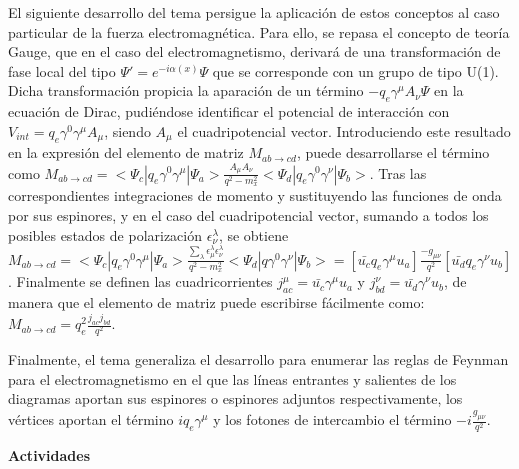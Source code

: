 El siguiente desarrollo del tema persigue la aplicación de estos conceptos al caso particular de la fuerza electromagnética. Para ello, se repasa el concepto de teoría Gauge, que en el caso del electromagnetismo, derivará de una transformación de fase local del tipo $\Psi' = e^{-i\alpha(x)}\Psi$ que se corresponde con un grupo de tipo U(1). Dicha transformación propicia la aparación de un término $-q_e\gamma^\mu A_{\nu}\Psi$ en la ecuación de Dirac, pudiéndose identificar el potencial de interacción con $V_{int}=q_e\gamma^0\gamma^\mu A_\mu$, siendo $A_\mu$ el cuadripotencial vector. Introduciendo este resultado en la expresión del elemento de matriz $M_{ab\rightarrow cd}$, puede desarrollarse el término como  $M_{ab\rightarrow cd}=<\Psi_c|q_e\gamma^0\gamma^\mu|\Psi_a>\frac{A_\mu A_\nu}{q^2-m_{x}^2}<\Psi_d|q_e\gamma^0\gamma^\nu|\Psi_b>$. Tras las correspondientes integraciones de momento y sustituyendo las funciones de onda por sus espinores, y en el caso del cuadripotencial vector, sumando a todos los posibles estados de polarización $\epsilon_\nu^\lambda$, se obtiene $M_{ab\rightarrow cd}=<\Psi_c|q_e\gamma^0\gamma^\mu|\Psi_a>\frac{\sum_{\lambda}\epsilon_\mu^\lambda\epsilon_\nu^\lambda}{q^2-m_{x}^2}<\Psi_d|q\gamma^0\gamma^\nu|\Psi_b>=[\bar{u_c}q_e\gamma^\mu u_a]\frac{-g_{\mu\nu}}{q^2}[\bar{u_d}q_e\gamma^\nu u_b]$. Finalmente se definen las cuadricorrientes $j_{ac}^\mu=\bar{u_c}\gamma^\mu u_a$ y $j_{bd}^\nu=\bar{u_d}\gamma^\nu u_b$, de manera que el elemento de matriz puede escribirse fácilmente como: $M_{ab\rightarrow cd}=q_e^2\frac{j_{ac}j_{bd}}{q^2}$. 

Finalmente, el tema generaliza el desarrollo para enumerar las reglas de Feynman para el electromagnetismo en el que las líneas entrantes y salientes de los diagramas aportan sus espinores o espinores adjuntos respectivamente, los vértices aportan el término $iq_e\gamma^{\mu}$ y los fotones de intercambio el término $-i\frac{g_{\mu\nu}}{q^2}$.

\textbf{Actividades}


